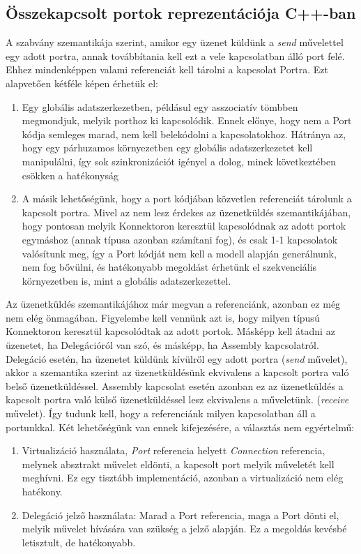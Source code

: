\documentclass[a4paper,12pt]{report}
\begin{document}
\subsection{Összekapcsolt portok reprezentációja C++-ban}
A szabvány szemantikája szerint, amikor egy üzenet küldünk a \textit{send} művelettel egy adott portra, annak továbbítania kell ezt a vele kapcsolatban álló port felé. Ehhez mindenképpen valami referenciát kell tárolni a kapcsolat Portra. Ezt alapvetően kétféle képen érhetük el:\\
\begin{enumerate}
\item Egy globális adatszerkezetben, példásul egy asszociatív tömbben megmondjuk, melyik porthoz ki kapcsolódik. Ennek előnye, hogy nem a Port kódja semleges marad, nem kell belekódolni a kapcsolatokhoz.
Hátránya az, hogy egy párhuzamos környezetben egy globális adatszerkezetet kell manipulálni, így sok szinkronizációt igényel a dolog, minek következtében csökken a hatékonyság
\item A másik lehetőségünk, hogy a port kódjában közvetlen referenciát tárolunk a kapcsolt portra. Mivel az nem lesz érdekes az üzenetküldés szemantikájában, hogy pontosan melyik Konnektoron keresztül kapcsolódnak az adott portok egymáshoz (annak típusa azonban számítani fog), és csak 1-1 kapcsolatok valósítunk meg, így a Port kódját nem kell a modell alapján generálnunk, nem fog bővülni, és hatékonyabb megoldást érhetünk el szekvenciális környezetben is, mint a globális adatszerkezettel. 
\end{enumerate}

Az üzenetküldés szemantikájához már megvan a referenciánk, azonban ez még nem elég önmagában. Figyelembe kell vennünk azt is, hogy milyen típusú Konnektoron keresztül kapcsolódtak az adott portok. Másképp kell átadni az üzenetet, ha Delegációról van szó, és másképp, ha Assembly kapcsolatról. Delegáció esetén, ha üzenetet küldünk kívülről egy adott portra (\textit{send} művelet), akkor a szemantika szerint az üzenetküldésünk ekvivalens a kapcsolt portra való belső üzenetküldéssel. Assembly kapcsolat esetén azonban ez az üzenetküldés a kapcsolt portra való külső üzenetküldéssel lesz ekvivalens a műveletünk. (\textit{receive} művelet). Így tudunk kell, hogy a referenciánk milyen kapcsolatban áll a portunkkal. Két lehetőségünk van ennek kifejezésére, a választás nem egyértelmű:
\begin{enumerate}
\item Virtualizáció használata, \textit{Port} referencia helyett \textit{Connection} referencia, melynek absztrakt művelet eldönti, a kapcsolt port melyik műveletét kell meghívni. Ez egy tisztább implementáció, azonban a virtualizáció nem elég hatékony.
\item Delegáció jelző használata: Marad a Port referencia, maga a Port dönti el, melyik művelet hívására van szükség a jelző alapján. Ez a megoldás kevésbé letisztult, de hatékonyabb. 
\end{enumerate}
\end{document}
